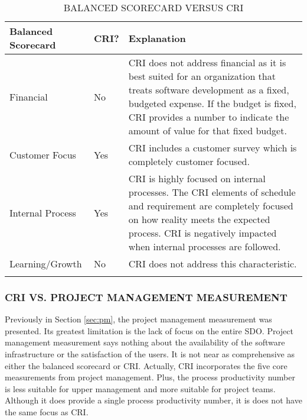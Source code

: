 \documentclass[SDSUThesis.tex]{subfiles}
\begin{document}
             \begin{longtable}{p{3cm}p{1cm}p{10cm}}
                
                \toprule%
                 \centering%
                 {\bfseries Balanced Scorecard}
                 & {\bfseries CRI?} 
                 & {\bfseries Explanation} \\
                
                \cmidrule[0.4pt](r{0.125em}){1-1}%
                \cmidrule[0.4pt](lr{0.125em}){2-2}%
                \cmidrule[0.4pt](lr{0.125em}){3-3}%
                \endhead
                
                Financial & No & CRI does not address financial as it is best suited 
                    for an organization that treats software development as a fixed,
                    budgeted expense. If the budget is fixed, CRI provides a number
                    to indicate the amount of value for that fixed budget.  \\
                \myrowcolour%
                Customer Focus & Yes & CRI includes a customer survey which is 
                    completely customer focused.\\
                Internal Process & Yes & CRI is highly focused on internal processes.
                    The CRI elements of schedule and requirement are completely
                    focused on how reality meets the expected process. CRI is
                    negatively impacted when internal processes are followed. \\
                \myrowcolour%
                Learning/Growth & No & CRI does not address this characteristic. \\
                
                \bottomrule
                
                \caption{BALANCED SCORECARD VERSUS CRI}
                \label{tab:bsc}
            \end{longtable}

        
        \subsubsection{CRI VS. PROJECT MANAGEMENT MEASUREMENT}
            Previously in Section \ref{sec:pm}, the project management
            measurement was presented.   Its greatest limitation is the lack of
            focus on the entire SDO.  Project management measurement says 
            nothing about the availability of the software infrastructure
            or the satisfaction of the users.  It is not near as comprehensive
            as either the balanced scorecard or CRI. Actually, CRI incorporates
            the five core measurements from project management.
            Plus, the process productivity
            number is less suitable for upper management and more
            suitable for project teams.  Although it does provide a single
            process productivity number, it is does not have the same focus
            as CRI.
            
            
            
            
\end{document}
